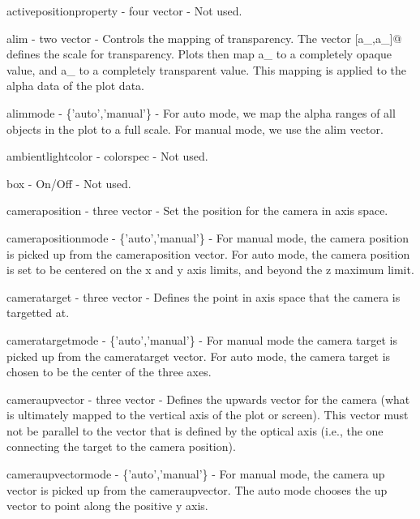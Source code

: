\begin{DoxyItemize}
\item {\ttfamily activepositionproperty} -\/ {\ttfamily four vector} -\/ Not used.  
\item {\ttfamily alim} -\/ {\ttfamily two vector} -\/ Controls the mapping of transparency. The vector {\ttfamily \mbox{[}a\-\_,a\-\_\mbox{]}}@ defines the scale for transparency. Plots then map {\ttfamily a\-\_} to a completely opaque value, and {\ttfamily a\-\_} to a completely transparent value. This mapping is applied to the alpha data of the plot data.  
\item {\ttfamily alimmode} -\/ {\ttfamily \{'auto','manual'\}} -\/ For {\ttfamily auto} mode, we map the alpha ranges of all objects in the plot to a full scale. For {\ttfamily manual} mode, we use the {\ttfamily alim} vector.  
\item {\ttfamily ambientlightcolor} -\/ {\ttfamily colorspec} -\/ Not used.  
\item {\ttfamily box} -\/ {\ttfamily On/\-Off} -\/ Not used.  
\item {\ttfamily cameraposition} -\/ {\ttfamily three vector} -\/ Set the position for the camera in axis space.  
\item {\ttfamily camerapositionmode} -\/ {\ttfamily \{'auto','manual'\}} -\/ For {\ttfamily manual} mode, the camera position is picked up from the {\ttfamily cameraposition} vector. For {\ttfamily auto} mode, the camera position is set to be centered on the {\ttfamily x} and {\ttfamily y} axis limits, and beyond the {\ttfamily z} maximum limit.  
\item {\ttfamily cameratarget} -\/ {\ttfamily three vector} -\/ Defines the point in axis space that the camera is targetted at.  
\item {\ttfamily cameratargetmode} -\/ {\ttfamily \{'auto','manual'\}} -\/ For {\ttfamily manual} mode the camera target is picked up from the {\ttfamily cameratarget} vector. For {\ttfamily auto} mode, the camera target is chosen to be the center of the three axes.  
\item {\ttfamily cameraupvector} -\/ {\ttfamily three vector} -\/ Defines the upwards vector for the camera (what is ultimately mapped to the vertical axis of the plot or screen). This vector must not be parallel to the vector that is defined by the optical axis (i.\-e., the one connecting the target to the camera position).  
\item {\ttfamily cameraupvectormode} -\/ {\ttfamily \{'auto','manual'\}} -\/ For {\ttfamily manual} mode, the camera up vector is picked up from the {\ttfamily cameraupvector}. The {\ttfamily auto} mode chooses the up vector to point along the positive {\ttfamily y} axis.  

\end{DoxyItemize}
